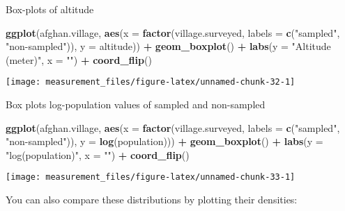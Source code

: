 \documentclass[]{book}
\newenvironment{Shaded}{\begin{snugshade}}{\end{snugshade}}
\newcommand{\DataTypeTok}[1]{\textcolor[rgb]{0.13,0.29,0.53}{#1}}
\newcommand{\KeywordTok}[1]{\textcolor[rgb]{0.13,0.29,0.53}{\textbf{#1}}}
\newcommand{\NormalTok}[1]{#1}
\newcommand{\OperatorTok}[1]{\textcolor[rgb]{0.81,0.36,0.00}{\textbf{#1}}}
\newcommand{\StringTok}[1]{\textcolor[rgb]{0.31,0.60,0.02}{#1}}
\theoremstyle{definition}
\theoremstyle{definition}
\theoremstyle{definition}
\theoremstyle{remark}
\begin{document}
Box-plots of altitude

\begin{Shaded}
\begin{Highlighting}[]
\KeywordTok{ggplot}\NormalTok{(afghan.village, }\KeywordTok{aes}\NormalTok{(}\DataTypeTok{x =} \KeywordTok{factor}\NormalTok{(village.surveyed,}
                                      \DataTypeTok{labels =} \KeywordTok{c}\NormalTok{(}\StringTok{"sampled"}\NormalTok{, }\StringTok{"non-sampled"}\NormalTok{)),}
                           \DataTypeTok{y =}\NormalTok{ altitude)) }\OperatorTok{+}
\StringTok{  }\KeywordTok{geom_boxplot}\NormalTok{() }\OperatorTok{+}
\StringTok{  }\KeywordTok{labs}\NormalTok{(}\DataTypeTok{y =} \StringTok{"Altitude (meter)"}\NormalTok{, }\DataTypeTok{x =} \StringTok{""}\NormalTok{) }\OperatorTok{+}
\StringTok{  }\KeywordTok{coord_flip}\NormalTok{()}
\end{Highlighting}
\end{Shaded}

\begin{center}\texttt{[image: measurement\_files/figure-latex/unnamed-chunk-32-1]} \end{center}

Box plots log-population values of sampled and non-sampled

\begin{Shaded}
\begin{Highlighting}[]
\KeywordTok{ggplot}\NormalTok{(afghan.village, }\KeywordTok{aes}\NormalTok{(}\DataTypeTok{x =} \KeywordTok{factor}\NormalTok{(village.surveyed,}
                                      \DataTypeTok{labels =} \KeywordTok{c}\NormalTok{(}\StringTok{"sampled"}\NormalTok{, }\StringTok{"non-sampled"}\NormalTok{)),}
                           \DataTypeTok{y =} \KeywordTok{log}\NormalTok{(population))) }\OperatorTok{+}
\StringTok{  }\KeywordTok{geom_boxplot}\NormalTok{() }\OperatorTok{+}
\StringTok{  }\KeywordTok{labs}\NormalTok{(}\DataTypeTok{y =} \StringTok{"log(population)"}\NormalTok{, }\DataTypeTok{x =} \StringTok{""}\NormalTok{) }\OperatorTok{+}
\StringTok{  }\KeywordTok{coord_flip}\NormalTok{()}
\end{Highlighting}
\end{Shaded}

\begin{center}\texttt{[image: measurement\_files/figure-latex/unnamed-chunk-33-1]} \end{center}

You can also compare these distributions by plotting their densities:
\end{document}
